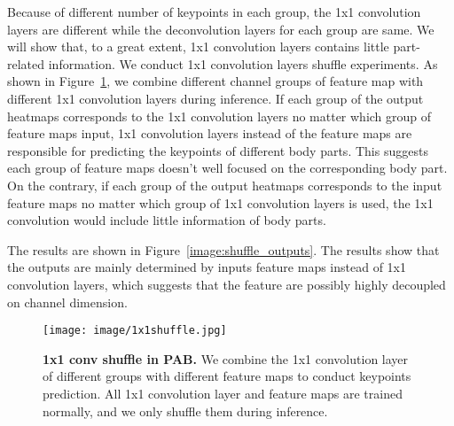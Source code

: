 \documentclass[10pt,twocolumn,letterpaper]{article}
\begin{document}
Because of different number of keypoints in each group, the 1x1 convolution layers are different while the deconvolution layers for each group are same. We will show that, to a great extent, 1x1 convolution layers contains little part-related information. We conduct 1x1 convolution layers shuffle experiments. As shown in Figure~\ref{image:shuffle}, we combine different channel groups of feature map with different 1x1 convolution layers during inference. 
If each group of the output heatmaps corresponds to the 1x1 convolution layers no matter which group of feature maps input, 1x1 convolution layers instead of the feature maps are responsible for predicting the keypoints of different body parts. This suggests each group of feature maps doesn't well focused on the corresponding body part. On the contrary, if each group of the output heatmaps corresponds to the input feature maps no matter which group of 1x1 convolution layers is used, the 1x1 convolution would include little information of body parts.

The results are shown in Figure~\ref{image:shuffle_outputs}. The results show that the outputs are mainly determined by inputs feature maps instead of 1x1 convolution layers, which suggests that the feature are possibly highly decoupled on channel dimension.


\begin{figure}[h]
	\begin{center}
		\begin{minipage}[t]{\linewidth}
			\vspace{-1mm}
\texttt{[image: image/1x1shuffle.jpg]}
		\end{minipage}
	\end{center}
	\vspace{-1mm}
	\caption{\textbf{1x1 conv shuffle in PAB.} We combine the 1x1 convolution layer of different groups with different feature maps to conduct keypoints prediction. All 1x1 convolution layer and feature maps are trained normally, and we only shuffle them during inference.
	}
	\label{image:shuffle}
\end{figure}
\end{document}
